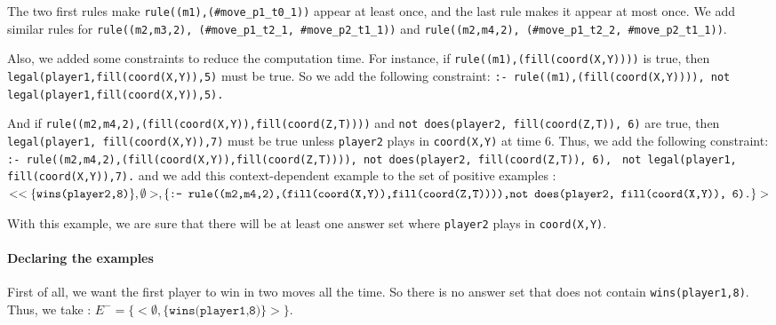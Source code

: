\documentclass[12pt,twoside]{report}
\begin{document}
The two first rules make \texttt{rule((m1),(\#move\_p1\_t0\_1))} appear at least once, and the last rule makes it appear at most once. We add similar rules for \texttt{rule((m2,m3,2), (\#move\_p1\_t2\_1, \#move\_p2\_t1\_1))} and \texttt{rule((m2,m4,2), (\#move\_p1\_t2\_2, \#move\_p2\_t1\_1))}.

\bigskip

Also, we added some constraints to reduce the computation time. For instance, if \texttt{rule((m1),(fill(coord(X,Y))))} is true, then \texttt{legal(player1,fill(coord(X,Y)),5)} must be true. So we add the following constraint:\newline
\texttt{:- rule((m1),(fill(coord(X,Y)))), not legal(player1,fill(coord(X,Y)),5).}

\bigskip

And if \texttt{rule((m2,m4,2),(fill(coord(X,Y)),fill(coord(Z,T))))} and \texttt{not does(player2, fill(coord(Z,T)), 6)} are true, then \texttt{legal(player1, fill(coord(X,Y)),7)} must be true unless \texttt{player2} plays in \texttt{coord(X,Y)} at time 6. Thus, we add the following constraint:\newline
\texttt{:- rule((m2,m4,2),(fill(coord(X,Y)),fill(coord(Z,T)))), not does(player2, fill(coord(Z,T)), 6),}
\texttt{ not legal(player1, fill(coord(X,Y)),7).}\newline
and we add this context-dependent example to the set of positive examples : \newline
$<<\{\texttt{wins(player2,8)}\},\emptyset>,\\ \{\texttt{:- rule((m2,m4,2),(fill(coord(X,Y)),fill(coord(Z,T)))),} \\ \texttt{not does(player2, fill(coord(X,Y)), 6).}\}>$

\smallskip

With this example, we are sure that there will be at least one answer set where \texttt{player2} plays in \texttt{coord(X,Y)}.


\paragraph{Declaring the examples}

First of all, we want the first player to win in two moves all the time. So there is no answer set that does not contain \texttt{wins(player1,8)}. Thus, we take : $E^-=\{<\emptyset,\{\texttt{wins(player1,8)}\}>\}$.

\bigskip
\end{document}
